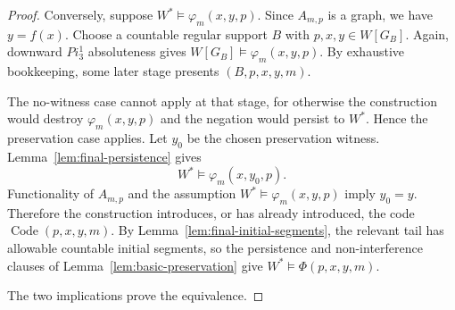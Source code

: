\documentclass[10pt,a4paper]{amsart}
\newcommand{\Code}{\operatorname{Code}}
\def\Pi{Pi}%
\begin{document}
\begin{proof}
Conversely, suppose $W^*\models\varphi_m(x,y,p)$. Since $A_{m,p}$ is a graph,
we have $y=f(x)$. Choose a countable regular support $B$ with
$p,x,y\in W[G_B]$. Again, downward $\Pi^1_3$ absoluteness gives
$W[G_B]\models\varphi_m(x,y,p)$. By exhaustive bookkeeping, some later stage
presents $(B,p,x,y,m)$.

The no-witness case cannot apply at that stage, for otherwise the construction
would destroy $\varphi_m(x,y,p)$ and the negation would persist to $W^*$. Hence
the preservation case applies. Let $y_0$ be the chosen preservation witness.
Lemma~\ref{lem:final-persistence} gives
\[
   W^*\models\varphi_m(x,y_0,p).
\]
Functionality of $A_{m,p}$ and the assumption
$W^*\models\varphi_m(x,y,p)$ imply $y_0=y$. Therefore the construction
introduces, or has already introduced, the code $\Code(p,x,y,m)$. By
Lemma~\ref{lem:final-initial-segments}, the relevant tail has allowable
countable initial segments, so the persistence and non-interference clauses of
Lemma~\ref{lem:basic-preservation} give $W^*\models\Phi(p,x,y,m)$.

The two implications prove the equivalence.
\end{proof}
\end{document}
